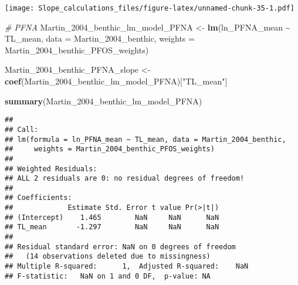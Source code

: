 \documentclass[
]{article}
\newenvironment{Shaded}{\begin{snugshade}}{\end{snugshade}}
\newcommand{\AttributeTok}[1]{\textcolor[rgb]{0.13,0.29,0.53}{#1}}
\newcommand{\CommentTok}[1]{\textcolor[rgb]{0.56,0.35,0.01}{\textit{#1}}}
\newcommand{\FunctionTok}[1]{\textcolor[rgb]{0.13,0.29,0.53}{\textbf{#1}}}
\newcommand{\NormalTok}[1]{#1}
\newcommand{\OtherTok}[1]{\textcolor[rgb]{0.56,0.35,0.01}{#1}}
\newcommand{\SpecialCharTok}[1]{\textcolor[rgb]{0.81,0.36,0.00}{\textbf{#1}}}
\newcommand{\StringTok}[1]{\textcolor[rgb]{0.31,0.60,0.02}{#1}}
\begin{document}
\texttt{[image: Slope\_calculations\_files/figure-latex/unnamed-chunk-35-1.pdf]}

\begin{Shaded}
\begin{Highlighting}[]
\CommentTok{\# PFNA}
\NormalTok{Martin\_2004\_benthic\_lm\_model\_PFNA }\OtherTok{\textless{}{-}} \FunctionTok{lm}\NormalTok{(ln\_PFNA\_mean }\SpecialCharTok{\textasciitilde{}}\NormalTok{ TL\_mean, }
                                        \AttributeTok{data =}\NormalTok{ Martin\_2004\_benthic,}
                                        \AttributeTok{weights =}\NormalTok{ Martin\_2004\_benthic\_PFOS\_weights)}

\NormalTok{Martin\_2004\_benthic\_PFNA\_slope }\OtherTok{\textless{}{-}} \FunctionTok{coef}\NormalTok{(Martin\_2004\_benthic\_lm\_model\_PFNA)[}\StringTok{"TL\_mean"}\NormalTok{]}

\FunctionTok{summary}\NormalTok{(Martin\_2004\_benthic\_lm\_model\_PFNA)}
\end{Highlighting}
\end{Shaded}

\begin{verbatim}
## 
## Call:
## lm(formula = ln_PFNA_mean ~ TL_mean, data = Martin_2004_benthic, 
##     weights = Martin_2004_benthic_PFOS_weights)
## 
## Weighted Residuals:
## ALL 2 residuals are 0: no residual degrees of freedom!
## 
## Coefficients:
##             Estimate Std. Error t value Pr(>|t|)
## (Intercept)    1.465        NaN     NaN      NaN
## TL_mean       -1.297        NaN     NaN      NaN
## 
## Residual standard error: NaN on 0 degrees of freedom
##   (14 observations deleted due to missingness)
## Multiple R-squared:      1,  Adjusted R-squared:    NaN 
## F-statistic:   NaN on 1 and 0 DF,  p-value: NA
\end{verbatim}
\end{document}
